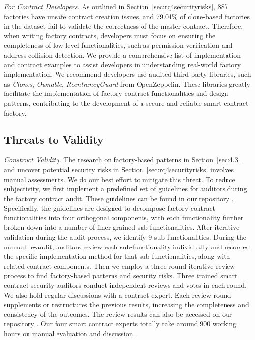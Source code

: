 \documentclass[acmsmall,screen]{acmart}
\begin{document}
	\textit{For Contract Developers.} As outlined in Section~\ref{sec:rq4securityrisks}, 887 factories have unsafe contract creation issues, and 79.04\% of clone-based factories in the dataset fail to validate the correctness of the master contract.  Therefore, when writing factory contracts, developers must focus on ensuring the completeness of low-level functionalities, such as permission verification and address collision detection. We provide a comprehensive list of implementation and contract examples to assist developers in understanding real-world factory implementation.  We recommend developers use audited third-party libraries, such as \textit{Clones}, \textit{Ownable}, \textit{ReentrancyGuard} from OpenZeppelin. These libraries greatly facilitate the implementation of factory contract functionalities and design patterns, contributing to the development of a secure and reliable smart contract factory.
	\subsection{Threats to Validity}


	\textit{Construct Validity.} The research on factory-based patterns in Section~\ref{sec:4.3} and uncover potential security risks in Section~\ref{sec:rq4securityrisks} involves manual assessments. We do our best effort to mitigate this threat. To reduce subjectivity, we first implement a predefined set of guidelines for auditors during the factory contract audit. These guidelines can be found in our repository \cite{fscdata}. Specifically, the guidelines are designed to decompose factory contract functionalities into four orthogonal components, with each functionality further broken down into a number of finer-grained sub-functionalities. After iterative validation during the audit process, we identify 9 sub-functionalities. During the manual re-audit, auditors review each sub-functionality individually and recorded the specific implementation method for that sub-functionalities, along with related contract components. Then we employ a three-round iterative review process to find factory-based patterns and security risks. Three trained smart contract security auditors conduct independent reviews and votes in each round. We also hold regular discussions with a contract expert. Each review round supplements or restructures the previous results, increasing the completeness and consistency of the outcomes. The review results can also be accessed on our repository \cite{fscdata}. Our four smart contract experts totally take around 900 working hours on manual evaluation and discussion.
\end{document}
